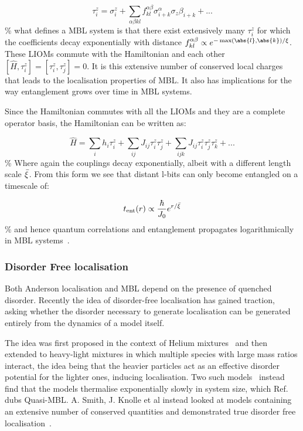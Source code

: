 \[ \tau^z_i = \sigma^z_i + \sum_{\alpha\beta kl} f_{kl}^{\alpha\beta} \sigma^\alpha_{i+k} \sigma_z\beta_{i+k} + ...\] \% what defines a MBL system is that there exist extensively many \(\tau^z_i\) for which the coefficients decay exponentially with distance \(f_{kl}^{\alpha\beta} \propto e^{-\max(\abs{l},\abs{k}) / \xi}\). These LIOMs commute with the Hamiltonian and each other \([\hat{H}, \tau^z_i] = [\tau^z_i, \tau^z_j] = 0\). It is this extensive number of conserved local charges that leads to the localisation properties of MBL. It also has implications for the way entanglement grows over time in MBL systems.

Since the Hamiltonian commutes with all the LIOMs and they are a complete operator basis, the Hamiltonian can be written as:

\[\hat{H} = \sum_{i} h_i \tau^z_i + \sum_{ij} J_{ij} \tau^z_i \tau^z_j + \sum_{ijk} J_{ij} \tau^z_i \tau^z_j \tau^z_k+ ...\] \% Where again the couplings decay exponentially, albeit with a different length scale \(\Bar{\xi}\). From this form we see that distant l-bits can only become entangled on a timescale of:

\[ t_{\mathrm{ent}}(r) \propto \frac{\hbar}{J_0} e^{r/\Bar{\xi}} \] \% and hence quantum correlations and entanglement propagates logarithmically in MBL systems~\autocite{imbrieDiagonalizationManyBodyLocalization2016}.

\hypertarget{disorder-free-localisation}{%
\subsubsection{Disorder Free localisation}\label{disorder-free-localisation}}

Both Anderson localisation and MBL depend on the presence of quenched disorder. Recently the idea of disorder-free localisation has gained traction, asking whether the disorder necessary to generate localisation can be generated entirely from the dynamics of a model itself.

The idea was first proposed in the context of Helium mixtures~\autocite{kagan1984localization} and then extended to heavy-light mixtures in which multiple species with large mass ratios interact, the idea being that the heavier particles act as an effective disorder potential for the lighter ones, inducing localisation. Two such models~\autocite{yaoQuasiManyBodyLocalizationTranslationInvariant2016,schiulazDynamicsManybodyLocalized2015} instead find that the models thermalise exponentially slowly in system size, which Ref.~\autocite{yaoQuasiManyBodyLocalizationTranslationInvariant2016} dubs Quasi-MBL. A. Smith, J. Knolle et al instead looked at models containing an extensive number of conserved quantities and demonstrated true disorder free localisation~\autocite{smithDisorderFreeLocalization2017}.


